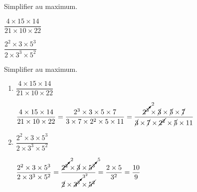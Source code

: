 \begin{exercice*}
    Simplifier au maximum.    
    \begin{enumerate}
            \setlength{\columnseprule}{0pt}
            \begin{multicols}{2}
                \item $\dfrac{4\times 15\times 14}{21\times 10\times 22}$
                \item $\dfrac{2^2\times 3\times 5^3}{2\times 3^3\times 5^2}$
            \end{multicols}
    \end{enumerate}        
\end{exercice*}
\begin{corrige}
    Simplifier au maximum.

    \begin{enumerate}
        \item $\dfrac{4\times 15\times 14}{21\times 10\times 22}$
        
        \textcolor{red}{
            $\dfrac{4\times 15\times 14}{21\times 10\times 22}=\dfrac{2^3\times 3\times 5\times 7}{3\times 7\times 2^2\times 5\times 11}=\dfrac{\cancelto{2}{2^3}\times \cancel{3}\times \cancel{5}\times \cancel{7}}{\cancel{3}\times \cancel{7}\times \cancel{2^2}\times \cancel{5}\times 11}$
        }
        \item $\dfrac{2^2\times 3\times 5^3}{2\times 3^3\times 5^2}$
        
        \textcolor{red}{
            $\dfrac{2^2\times 3\times 5^3}{2\times 3^3\times 5^2} = \dfrac{\cancelto{2}{2^2}\times \cancel{3}\times \cancelto{5}{5^3}}{\cancel{2}\times \cancelto{3^2}{3^3}\times \cancel{5^2}} = \dfrac{2\times 5}{3^2} = \dfrac{10}{9}$
        }
    \end{enumerate}    

\end{corrige}

